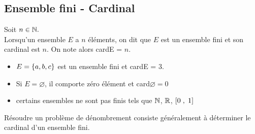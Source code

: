 
\everymath{\displaystyle}



\subsection{Ensemble fini - Cardinal}
\begin{definition}
Soit $ n\in\mathbb{N}. $\\
Lorsqu'un ensemble $ E $ a $ n $ éléments, on dit que $ E $ est un ensemble  fini et son cardinal est $ n. $ On note alors  cardE = $n$. 
\end{definition}
\begin{example}
\begin{itemize}
\item  $ E= \left\{a, b, c\right\}$ est un ensemble fini et cardE = $3.$
\item  Si $ E =\varnothing $, il comporte zéro élément et  card$ \varnothing =0$
\item  certains ensembles ne sont pas finis tels que $ \mathbb{N} $, $ \mathbb{R} $, $ \left[0\;,\; 1\right] $
\end{itemize}
\end{example}
\begin{remark}
Résoudre un problème de dénombrement consiste généralement à déterminer le cardinal d'un ensemble fini.
\end{remark} 
